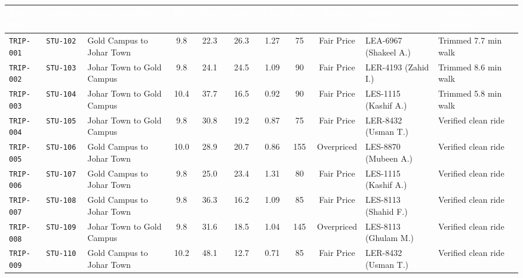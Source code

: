 \documentclass[10pt, a4paper]{article}
\begin{document}
\begin{table}[h!]
\centering
\fontsize{6.8pt}{8.6pt}\selectfont
\begin{tabularx}{\textwidth}{|l|l|l|c|c|c|c|c|c|p{2.4cm}|X|}
\hline
\rowcolor{navyblue}\textcolor{white}{\textbf{Trip ID}} & \textcolor{white}{\textbf{Student}} & \textcolor{white}{\textbf{Route Corridor}} & \textcolor{white}{\textbf{Dist}} & \textcolor{white}{\textbf{Time}} & \textcolor{white}{\textbf{Speed}} & \textcolor{white}{\textbf{Pace}} & \textcolor{white}{\textbf{Fare}} & \textcolor{white}{\textbf{Rating}} & \textcolor{white}{\textbf{Vehicle (Driver)}} & \textcolor{white}{\textbf{Cleaning Action Applied}} \\ \hline
\rowcolor{white}\texttt{TRIP-001} & \texttt{STU-102} & Gold Campus to Johar Town & 9.8 & 22.3 & 26.3 & 1.27 & 75 & Fair Price & LEA-6967 (Shakeel A.) & Trimmed 7.7 min walk \\ \hline
\rowcolor{lightgray}\texttt{TRIP-002} & \texttt{STU-103} & Johar Town to Gold Campus & 9.8 & 24.1 & 24.5 & 1.09 & 90 & Fair Price & LER-4193 (Zahid I.) & Trimmed 8.6 min walk \\ \hline
\rowcolor{white}\texttt{TRIP-003} & \texttt{STU-104} & Johar Town to Gold Campus & 10.4 & 37.7 & 16.5 & 0.92 & 90 & Fair Price & LES-1115 (Kashif A.) & Trimmed 5.8 min walk \\ \hline
\rowcolor{lightgray}\texttt{TRIP-004} & \texttt{STU-105} & Johar Town to Gold Campus & 9.8 & 30.8 & 19.2 & 0.87 & 75 & Fair Price & LER-8432 (Usman T.) & Verified clean ride \\ \hline
\rowcolor{white}\texttt{TRIP-005} & \texttt{STU-106} & Gold Campus to Johar Town & 10.0 & 28.9 & 20.7 & 0.86 & 155 & Overpriced & LES-8870 (Mubeen A.) & Verified clean ride \\ \hline
\rowcolor{lightgray}\texttt{TRIP-006} & \texttt{STU-107} & Gold Campus to Johar Town & 9.8 & 25.0 & 23.4 & 1.31 & 80 & Fair Price & LES-1115 (Kashif A.) & Verified clean ride \\ \hline
\rowcolor{white}\texttt{TRIP-007} & \texttt{STU-108} & Gold Campus to Johar Town & 9.8 & 36.3 & 16.2 & 1.09 & 85 & Fair Price & LES-8113 (Shahid F.) & Verified clean ride \\ \hline
\rowcolor{lightgray}\texttt{TRIP-008} & \texttt{STU-109} & Johar Town to Gold Campus & 9.8 & 31.6 & 18.5 & 1.04 & 145 & Overpriced & LES-8113 (Ghulam M.) & Verified clean ride \\ \hline
\rowcolor{white}\texttt{TRIP-009} & \texttt{STU-110} & Gold Campus to Johar Town & 10.2 & 48.1 & 12.7 & 0.71 & 85 & Fair Price & LER-8432 (Usman T.) & Verified clean ride \\ \hline

\end{tabularx}
\end{table}
\end{document}
